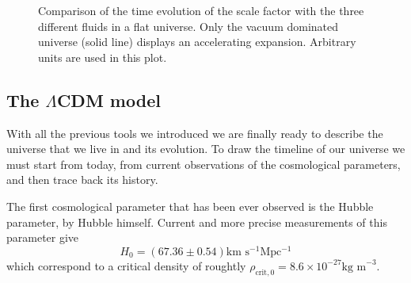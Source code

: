 \begin{figure}
    \centering
    \label{fig:a_comparison}
    \caption{Comparison of the time evolution of the scale factor with the three different fluids in a flat universe. Only the vacuum dominated universe (solid line) displays an accelerating expansion. Arbitrary units are used in this plot.}
\end{figure}
\subsection{The $\Lambda$CDM model} 
\label{sec:LambdaCDM}
With all the previous tools we introduced we are finally ready to describe the universe that we live in and its evolution. To draw the timeline of our universe we must start from today, from current observations of the cosmological parameters, and then trace back its history.

The first cosmological parameter that has been ever observed is the Hubble parameter, by Hubble himself. Current and more precise measurements \cite{planck2018results} of this parameter give
$$H_0=(67.36\pm0.54)\text{km s$^{-1}$Mpc$^{-1}$}$$
which correspond to a critical density of roughtly $\rho_{\text{crit},0}=8.6\times10^{-27}\text{kg m}^{-3}$.

